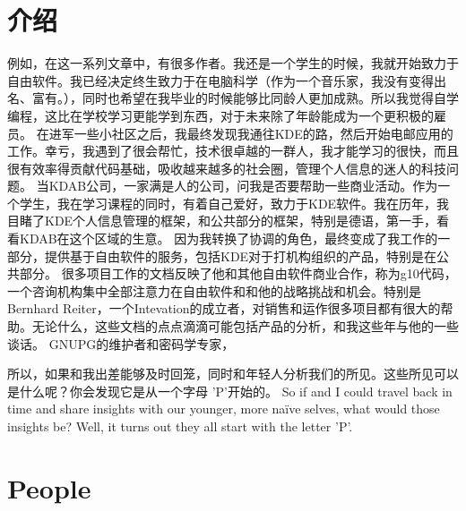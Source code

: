 

\section*{介绍}
例如，在这一系列文章中，有很多作者。我还是一个学生的时候，我就开始致力于自由软件。我已经决定终生致力于在电脑科学（作为一个音乐家，我没有变得出名、富有。），同时也希望在我毕业的时候能够比同龄人更加成熟。所以我觉得自学编程，这比在学校学习更能学到东西，对于未来除了年龄能成为一个更积极的雇员。
在进军一些小社区之后，我最终发现我通往KDE的路，然后开始电邮应用的工作。幸亏，我遇到了很会帮忙，技术很卓越的一群人，我才能学习的很快，而且很有效率得贡献代码基础，吸收越来越多的社会圈，管理个人信息的迷人的科技问题。
 当KDAB公司，一家满是人的公司，问我是否要帮助一些商业活动。作为一个学生，我在学习课程的同时，有着自己爱好，致力于KDE软件。我在历年，我目睹了KDE个人信息管理的框架，和公共部分的框架，特别是德语，第一手，看看KDAB在这个区域的生意。
因为我转换了协调的角色，最终变成了我工作的一部分，提供基于自由软件的服务，包括KDE对于打机构组织的产品，特别是在公共部分。
很多项目工作的文档反映了他和其他自由软件商业合作，称为g10代码，一个咨询机构集中全部注意力在自由软件和和他的战略挑战和机会。特别是Bernhard Reiter，一个Intevation的成立者，对销售和运作很多项目都有很大的帮助。无论什么，这些文档的点点滴滴可能包括产品的分析，和我这些年与他的一些谈话。
 GNUPG的维护者和密码学专家，

所以，如果和我出差能够及时回笼，同时和年轻人分析我们的所见。这些所见可以是什么呢？你会发现它是从一个字母
'P'开始的。
So if  and I could travel back in time and share insights with our younger, more
naïve selves, what would those insights be? Well, it turns out they all start with the
letter 'P'.

\section*{People}

